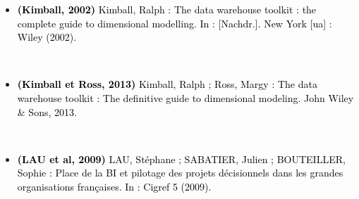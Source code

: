 \documentclass[a4paper,12pt]{report}
\begin{document}
\begin{itemize}
	\item[] \textcolor{black}{
\textbf{(Kimball, 2002)} Kimball, Ralph : The data warehouse toolkit :
the complete guide to dimensional modelling. In : [Nachdr.]. New York [ua] : Wiley (2002).	
}

~~\\
	\item[] \textcolor{black}{
\textbf{(Kimball et Ross, 2013)} Kimball, Ralph ; Ross, Margy : The data warehouse toolkit : The definitive guide to dimensional modeling. John Wiley \& Sons, 2013.	
}

~~\\
	\item[] \textcolor{black}{
\textbf{ (LAU et al, 2009)} LAU, Stéphane ; SABATIER, Julien ; BOUTEILLER, Sophie : Place de la BI et pilotage des projets décisionnels dans les grandes organisations françaises. In : Cigref 5 (2009).	
}

\end{itemize}
\end{document}
